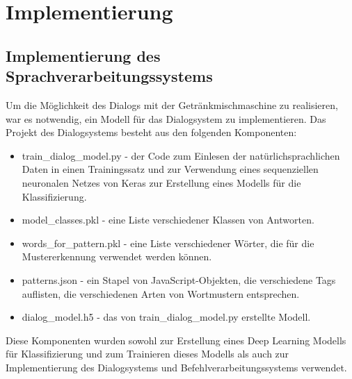 \chapter{Implementierung}
\section{Implementierung des Sprachverarbeitungssystems}\label{section:Implementierung_Sprachverarbeitung}
Um die Möglichkeit des Dialogs mit der Getränkmischmaschine zu realisieren, war es notwendig, ein Modell für das Dialogsystem zu implementieren. Das Projekt des Dialogsystems besteht aus den folgenden Komponenten:
\begin{itemize}
    \item train\_dialog\_model.py - der Code zum Einlesen der natürlichsprachlichen Daten in einen Trainingssatz und zur Verwendung eines sequenziellen neuronalen Netzes von Keras zur Erstellung eines Modells für die Klassifizierung.
    \item model\_classes.pkl - eine Liste verschiedener Klassen von Antworten.
    \item words\_for\_pattern.pkl - eine Liste verschiedener Wörter, die für die Mustererkennung verwendet werden können.
    \item patterns.json - ein Stapel von JavaScript-Objekten, die verschiedene Tags auflisten, die verschiedenen Arten von Wortmustern entsprechen.
    \item dialog\_model.h5 - das von train\_dialog\_model.py erstellte Modell.
\end{itemize}
Diese Komponenten wurden sowohl zur Erstellung eines Deep Learning Modells für Klassifizierung und zum Trainieren dieses Modells als auch zur Implementierung des Dialogsystems und Befehlverarbeitungssystems verwendet.
